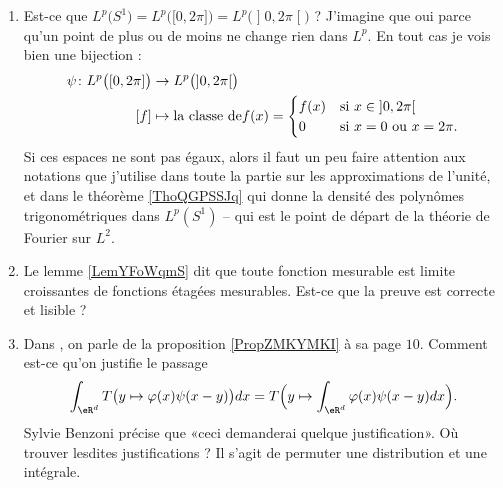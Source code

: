 \begin{enumerate}
    \item
        Est-ce que \( L^p\big( S^1 \big)=L^p\big( \mathopen[ 0 , 2\pi \mathclose] \big)=L^p\big( \mathopen] 0 , 2\pi \mathclose[ \big)\) ? J'imagine que oui parce qu'un point de plus ou de moins ne change rien dans \( L^p\). En tout cas je vois bien une bijection :
            \begin{equation}
                \begin{aligned}
                    \psi\colon L^p\big( \mathopen[ 0 , 2\pi \mathclose] \big)&\to L^p\big( \mathopen] 0 , 2\pi \mathclose[ \big) \\
                        [f]&\mapsto \text{la classe de} f(x)=\begin{cases}
                            f(x)    &   \text{si \( x\in\mathopen] 0 , 2\pi \mathclose[\)}\\
                            0    &    \text{si \( x=0\) ou \( x=2\pi\)}.
                        \end{cases}
                \end{aligned}
            \end{equation}
            Si ces espaces ne sont pas égaux, alors il faut un peu faire attention aux notations que j'utilise dans toute la partie sur les approximations de l'unité, et dans le théorème \ref{ThoQGPSSJq} qui donne la densité des polynômes trigonométriques dans \( L^p(S^1)\) -- qui est le point de départ de la théorie de Fourier sur \( L^2\). 

        \item
            Le lemme \ref{LemYFoWqmS} dit que toute fonction mesurable est limite croissantes de fonctions étagées mesurables. Est-ce que la preuve est correcte et lisible ?

        \item 
            Dans \cite{OEVAuEz}, on parle de la proposition \ref{PropZMKYMKI} à sa page \( 10\). Comment est-ce qu'on justifie le passage
            \begin{equation}
                \int_{\eR^d}T\big( y\mapsto \varphi(x)\psi(x-y) \big)dx=T\Big( y\mapsto\int_{\eR^d}\varphi(x)\psi(x-y)dx \Big).
            \end{equation}
            Sylvie Benzoni précise que «ceci demanderai quelque justification». Où trouver lesdites justifications ? Il s'agit de permuter une distribution et une intégrale.


\end{enumerate}
